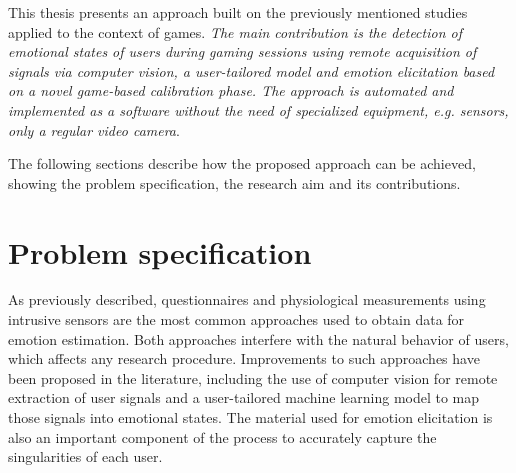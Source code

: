 This thesis presents an approach built on the previously mentioned studies applied to the context of games. \textit{The main contribution is the detection of emotional states of users during gaming sessions using remote acquisition of signals via computer vision, a user-tailored model and emotion elicitation based on a novel game-based calibration phase. The approach is automated and implemented as a software without the need of specialized equipment, e.g. sensors, only a regular video camera}.


The following sections describe how the proposed approach can be achieved, showing the problem specification, the research aim and its contributions.

\section{Problem specification}
\label{sec:problem-specification}

As previously described, questionnaires and physiological measurements using intrusive sensors are the most common approaches used to obtain data for emotion estimation. Both approaches interfere with the natural behavior of users, which affects any research procedure. Improvements to such approaches have been proposed in the literature, including the use of computer vision for remote extraction of user signals and a user-tailored machine learning model to map those signals into emotional states. The material used for emotion elicitation is also an important component of the process to accurately capture the singularities of each user.

